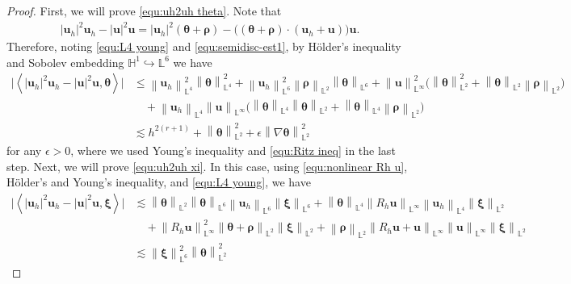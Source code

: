 \documentclass[11pt, reqno]{amsart}
\theoremstyle{definition}
\theoremstyle{remark}
\numberwithin{equation}{section}
\newcommand{\bff}{\boldsymbol}
\newcommand{\bb}{\mathbb}
\newcommand{\norm}[2]{\left\|{#1}\right\|_{#2}}
\newcommand{\inpro}[2]{\left\langle#1,#2\right\rangle}
\begin{document}
\begin{proof}
First, we will prove \eqref{equ:uh2uh theta}. Note that
	\begin{align}\label{equ:simple uhu}
		|\bff{u}_h|^2 \bff{u}_h - |\bff{u}|^2 \bff{u}
		=
		|\bff{u}_h|^2 (\bff{\theta}+\bff{\rho}) - \big( (\bff{\theta}+\bff{\rho})\cdot (\bff{u}_h+\bff{u}) \big) \bff{u}.
	\end{align}
Therefore, noting \eqref{equ:L4 young} and \eqref{equ:semidisc-est1}, by H\"{o}lder's inequality and Sobolev embedding $\bb{H}^1 \hookrightarrow \bb{L}^6$ we have
	\begin{align*}
		\big| \inpro{|\bff{u}_h|^2 \bff{u}_h - |\bff{u}|^2 \bff{u}}{\bff{\theta}} \big|
		&\leq
		\norm{\bff{u}_h}{\bb{L}^4}^2 \norm{\bff{\theta}}{\bb{L}^4}^2
		+
		\norm{\bff{u}_h}{\bb{L}^6}^2 \norm{\bff{\rho}}{\bb{L}^2} \norm{\bff{\theta}}{\bb{L}^6}
		+
		\norm{\bff{u}}{\bb{L}^\infty}^2
		\big(
		\norm{\bff{\theta}}{\bb{L}^2}^2
		+
		\norm{\bff{\theta}}{\bb{L}^2}
		\norm{\bff{\rho}}{\bb{L}^2}
		\big)
		\\
		&\quad
		+
		\norm{\bff{u}_h}{\bb{L}^4} 
		\norm{\bff{u}}{\bb{L}^\infty}
		\big(
		\norm{\bff{\theta}}{\bb{L}^4}
		\norm{\bff{\theta}}{\bb{L}^2}
		+
		\norm{\bff{\theta}}{\bb{L}^4}
		\norm{\bff{\rho}}{\bb{L}^2}
		\big)
		\\
		&\lesssim
		h^{2(r+1)}
		+
	 	\norm{\bff{\theta}}{\bb{L}^2}^2 
		+ 
		\epsilon \norm{\nabla \bff{\theta}}{\bb{L}^2}^2
	\end{align*}
for any $\epsilon>0$, where we used Young's inequality and \eqref{equ:Ritz ineq} in the last step. Next, we will prove \eqref{equ:uh2uh xi}. In this case, using \eqref{equ:nonlinear Rh u}, H\"{o}lder's and Young's inequality, and \eqref{equ:L4 young}, we have
	\begin{align*}
		\nonumber
		\big| \inpro{|\bff{u}_h|^2 \bff{u}_h - |\bff{u}|^2 \bff{u}}{\bff{\xi}} \big|
		&\lesssim
		\norm{\bff{\theta}}{\bb{L}^2}
		\norm{\bff{\theta}}{\bb{L}^6}
		\norm{\bff{u}_h}{\bb{L}^6}
		\norm{\bff{\xi}}{\bb{L}^6}
		+
		\norm{\bff{\theta}}{\bb{L}^4}
		\norm{R_h \bff{u}}{\bb{L}^\infty}
		\norm{\bff{u}_h}{\bb{L}^4}
		\norm{\bff{\xi}}{\bb{L}^2}
		\\
		\nonumber
		&\quad
		+
		\norm{R_h \bff{u}}{\bb{L}^\infty}^2
		\norm{\bff{\theta}+\bff{\rho}}{\bb{L}^2}
		\norm{\bff{\xi}}{\bb{L}^2}
		+
		\norm{\bff{\rho}}{\bb{L}^2}
		\norm{R_h \bff{u}+ \bff{u}}{\bb{L}^\infty}
		\norm{\bff{u}}{\bb{L}^\infty}
		\norm{\bff{\xi}}{\bb{L}^2}
		\\
		\nonumber
		&\lesssim
		\norm{\bff{\xi}}{\bb{L}^6}^2 \norm{\bff{\theta}}{\bb{L}^2}^2 

\end{align*}
\end{proof}
\end{document}
